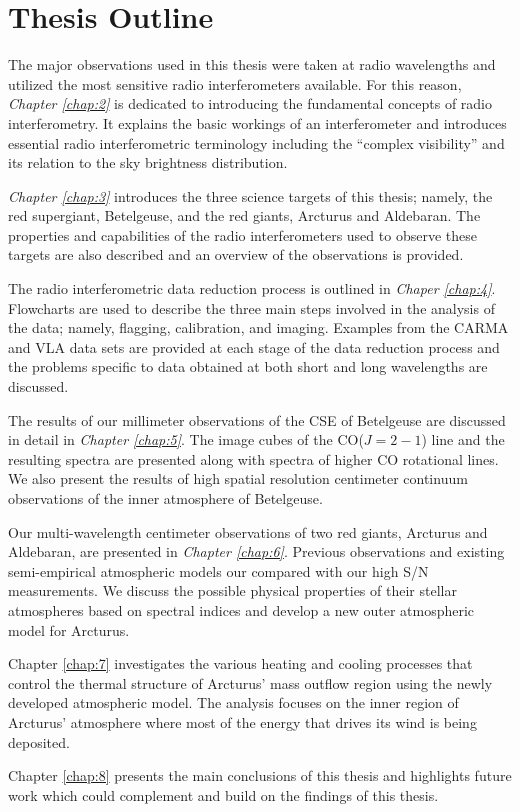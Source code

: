 \section{Thesis Outline}
The major observations used in this thesis were taken at radio wavelengths and utilized the most sensitive radio interferometers available. For this reason, \textit{Chapter \ref{chap:2}} is dedicated to introducing the fundamental concepts of radio interferometry. It explains the basic workings of an interferometer and introduces essential radio interferometric  terminology including the ``complex visibility'' and its relation to the sky brightness distribution.

\textit{Chapter \ref{chap:3}} introduces the three science targets of this thesis; namely, the red supergiant, Betelgeuse, and the red giants, Arcturus and Aldebaran. The properties and capabilities of the radio interferometers used to observe these targets are also described and an overview of the observations is provided.

The radio interferometric data reduction process is outlined in \textit{Chaper \ref{chap:4}}. Flowcharts are used to describe the three main steps involved in the analysis of the data; namely, flagging, calibration, and imaging. Examples from the CARMA and VLA data sets are provided at each stage of the data reduction process and the problems specific to data obtained at both short and long wavelengths are discussed. 

The results of our millimeter observations of the CSE of Betelgeuse are discussed in detail in \textit{Chapter \ref{chap:5}}. The image cubes of the CO($J=2-1$) line and the resulting spectra are presented along with spectra of higher CO rotational lines. We also present the results of high spatial resolution centimeter continuum observations of the inner atmosphere of Betelgeuse.

Our multi-wavelength centimeter observations of two red giants, Arcturus and Aldebaran, are presented in \textit{Chapter \ref{chap:6}}. Previous observations and existing semi-empirical atmospheric models our compared with our high S/N measurements. We discuss the possible physical properties of their stellar atmospheres based on spectral indices and develop a new outer atmospheric model for Arcturus.

Chapter \ref{chap:7} investigates the various heating and cooling processes that control the thermal structure of Arcturus' mass outflow region using the newly developed atmospheric model. The analysis focuses on the inner region of Arcturus' atmosphere where most of the energy that drives its wind is being deposited. 

Chapter \ref{chap:8} presents the main conclusions of this thesis and highlights future work which could complement and build on the findings of this thesis.
